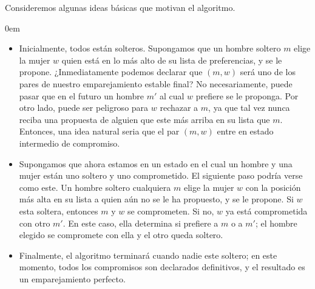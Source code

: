 \documentclass[a4paper, 12pt]{book}
\theoremstyle{dotless}
\begin{document}
Consideremos algunas ideas básicas que motivan el algoritmo. 

\itemsep0em
\begin{itemize}
    \item Inicialmente, todos están solteros. Supongamos que un hombre soltero $m$ elige la mujer $w$ quien está en lo más alto de su lista de preferencias, y se le propone. ¿Inmediatamente podemos declarar que $(m,w)$ será uno de los pares de nuestro emparejamiento estable final? No necesariamente, puede pasar que en el futuro un hombre $m'$ al cual $w$ prefiere se le proponga. Por otro lado, puede ser peligroso para $w$ rechazar a $m$, ya que tal vez nunca reciba una propuesta de alguien que este más arriba en su lista que $m$. Entonces, una idea natural seria que el par $(m,w)$ entre en estado intermedio de compromiso.
    \item Supongamos que ahora estamos en un estado en el cual un hombre y una mujer están uno soltero y uno comprometido. El siguiente paso podría verse como este. Un hombre soltero cualquiera $m$ elige la mujer $w$ con la posición más alta en su lista a quien aún no se le ha propuesto, y se le propone. Si $w$ esta soltera, entonces $m$ y $w$ se comprometen. Si no, $w$ ya está comprometida con otro $m'$. En este caso, ella determina si prefiere a $m$ o a $m'$; el hombre elegido se compromete con ella y el otro queda soltero. 
    \item Finalmente, el algoritmo terminará cuando nadie este soltero; en este momento, todos los compromisos son declarados definitivos, y el resultado es un emparejamiento perfecto. 
\end{itemize}
    
\end{document}
